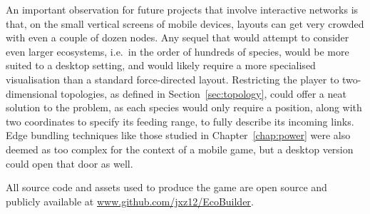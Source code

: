 An important observation for future projects that involve interactive networks is that, on the small vertical screens of mobile devices, layouts can get very crowded with even a couple of dozen nodes.
Any sequel that would attempt to consider even larger ecosystems, i.e.\ in the order of hundreds of species, would be more suited to a desktop setting, and would likely require a more specialised visualisation than a standard force-directed layout.
Restricting the player to two-dimensional topologies, as defined in Section~\ref{sec:topology}, could offer a neat solution to the problem, as each species would only require a position, along with two coordinates to specify its feeding range, to fully describe its incoming links.
Edge bundling techniques like those studied in Chapter~\ref{chap:power} were also deemed as too complex for the context of a mobile game, but a desktop version could open that door as well.

All source code and assets used to produce the game are open source and publicly available at \url{www.github.com/jxz12/EcoBuilder}.